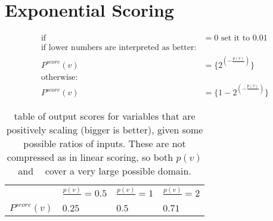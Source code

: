 \documentclass{amsart}
\newcommand*\mean[1]{\mathop{\overline{#1}}}
\begin{document}
\section{Exponential Scoring}

\begin{align}
\text{if } \mean{H_p(v)} &= 0\text{ set it to } 0.01\\
\text{if lower numbers are interpreted as better:}&\\
P^{score}(v) &= \{2^{\left(-\frac{p(v)}{\mean{H_p(v)}}\right)}\}\\
\text{otherwise:}&\\
P^{score}(v) &= \{1-2^{\left(-\frac{p(v)}{\mean{H_p(v)}}\right)}\}
\end{align}

\begin{table}[h]
	\begin{tabular}{llll}
		&$\frac{p(v)}{\mean{H_p(v)}} =0.5$&$\frac{p(v)}{\mean{H_p(v)}} = 1$ &$\frac{p(v)}{\mean{H_p(v)}} = 2$\\
		$P^{score}(v)$ &$0.25$ & $0.5$ &  $0.71$
	\end{tabular}
	\caption{table of output scores for variables that are positively scaling (bigger is better), given some possible ratios of inputs. These are not compressed as in linear scoring, so both $p(v)$ and $\mean{H_p(v)}$ cover a very large possible domain.}
\end{table}
\end{document}
